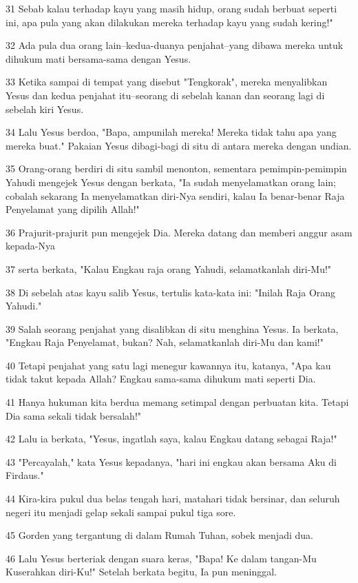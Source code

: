 \par 31 Sebab kalau terhadap kayu yang masih hidup, orang sudah berbuat seperti ini, apa pula yang akan dilakukan mereka terhadap kayu yang sudah kering!"
\par 32 Ada pula dua orang lain--kedua-duanya penjahat--yang dibawa mereka untuk dihukum mati bersama-sama dengan Yesus.
\par 33 Ketika sampai di tempat yang disebut "Tengkorak", mereka menyalibkan Yesus dan kedua penjahat itu--seorang di sebelah kanan dan seorang lagi di sebelah kiri Yesus.
\par 34 Lalu Yesus berdoa, "Bapa, ampunilah mereka! Mereka tidak tahu apa yang mereka buat." Pakaian Yesus dibagi-bagi di situ di antara mereka dengan undian.
\par 35 Orang-orang berdiri di situ sambil menonton, sementara pemimpin-pemimpin Yahudi mengejek Yesus dengan berkata, "Ia sudah menyelamatkan orang lain; cobalah sekarang Ia menyelamatkan diri-Nya sendiri, kalau Ia benar-benar Raja Penyelamat yang dipilih Allah!"
\par 36 Prajurit-prajurit pun mengejek Dia. Mereka datang dan memberi anggur asam kepada-Nya
\par 37 serta berkata, "Kalau Engkau raja orang Yahudi, selamatkanlah diri-Mu!"
\par 38 Di sebelah atas kayu salib Yesus, tertulis kata-kata ini: "Inilah Raja Orang Yahudi."
\par 39 Salah seorang penjahat yang disalibkan di situ menghina Yesus. Ia berkata, "Engkau Raja Penyelamat, bukan? Nah, selamatkanlah diri-Mu dan kami!"
\par 40 Tetapi penjahat yang satu lagi menegur kawannya itu, katanya, "Apa kau tidak takut kepada Allah? Engkau sama-sama dihukum mati seperti Dia.
\par 41 Hanya hukuman kita berdua memang setimpal dengan perbuatan kita. Tetapi Dia sama sekali tidak bersalah!"
\par 42 Lalu ia berkata, "Yesus, ingatlah saya, kalau Engkau datang sebagai Raja!"
\par 43 "Percayalah," kata Yesus kepadanya, "hari ini engkau akan bersama Aku di Firdaus."
\par 44 Kira-kira pukul dua belas tengah hari, matahari tidak bersinar, dan seluruh negeri itu menjadi gelap sekali sampai pukul tiga sore.
\par 45 Gorden yang tergantung di dalam Rumah Tuhan, sobek menjadi dua.
\par 46 Lalu Yesus berteriak dengan suara keras, "Bapa! Ke dalam tangan-Mu Kuserahkan diri-Ku!" Setelah berkata begitu, Ia pun meninggal.
